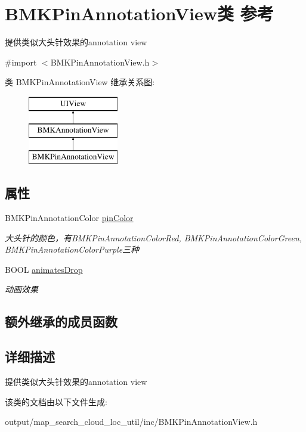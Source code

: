 \hypertarget{interface_b_m_k_pin_annotation_view}{\section{B\+M\+K\+Pin\+Annotation\+View类 参考}
\label{interface_b_m_k_pin_annotation_view}
}


提供类似大头针效果的annotation view  




{\ttfamily \#import $<$B\+M\+K\+Pin\+Annotation\+View.\+h$>$}

类 B\+M\+K\+Pin\+Annotation\+View 继承关系图\+:\begin{figure}[H]
\begin{center}
\leavevmode
\includegraphics[height=3.000000cm]{interface_b_m_k_pin_annotation_view}
\end{center}
\end{figure}
\subsection*{属性}
\begin{DoxyCompactItemize}
\item 
\hypertarget{interface_b_m_k_pin_annotation_view_a84f4c8db4dfa8d1d5a8ff6af8db7826d}{B\+M\+K\+Pin\+Annotation\+Color \hyperlink{interface_b_m_k_pin_annotation_view_a84f4c8db4dfa8d1d5a8ff6af8db7826d}{pin\+Color}}\label{interface_b_m_k_pin_annotation_view_a84f4c8db4dfa8d1d5a8ff6af8db7826d}

\begin{DoxyCompactList}\small\item\em 大头针的颜色，有\+B\+M\+K\+Pin\+Annotation\+Color\+Red, B\+M\+K\+Pin\+Annotation\+Color\+Green, B\+M\+K\+Pin\+Annotation\+Color\+Purple三种 \end{DoxyCompactList}\item 
\hypertarget{interface_b_m_k_pin_annotation_view_a0ea18aa3b2d71e06564bf11199d05625}{B\+O\+O\+L \hyperlink{interface_b_m_k_pin_annotation_view_a0ea18aa3b2d71e06564bf11199d05625}{animates\+Drop}}\label{interface_b_m_k_pin_annotation_view_a0ea18aa3b2d71e06564bf11199d05625}

\begin{DoxyCompactList}\small\item\em 动画效果 \end{DoxyCompactList}\end{DoxyCompactItemize}
\subsection*{额外继承的成员函数}


\subsection{详细描述}
提供类似大头针效果的annotation view 

该类的文档由以下文件生成\+:\begin{DoxyCompactItemize}
\item 
output/map\+\_\+search\+\_\+cloud\+\_\+loc\+\_\+util/inc/B\+M\+K\+Pin\+Annotation\+View.\+h\end{DoxyCompactItemize}
